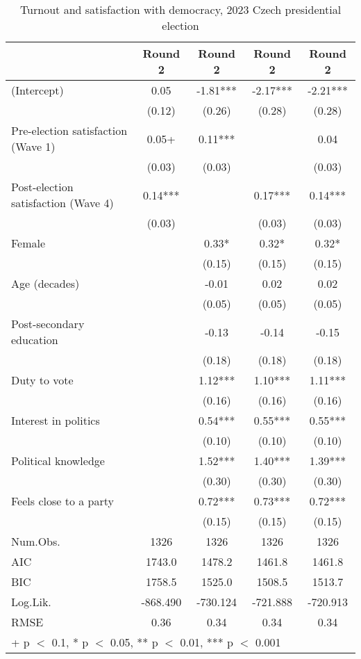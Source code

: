 \begin{table}

\caption{\label{tab:unnamed-chunk-4}Turnout and satisfaction with democracy, 2023 Czech presidential election}
\centering
\begin{tabular}[t]{lcccc}
\toprule
  & Round 2 & Round 2  & Round 2   & Round 2   \\
\midrule
(Intercept) & 0.05 & -1.81*** & -2.17*** & -2.21***\\
 & (0.12) & (0.26) & (0.28) & (0.28)\\
Pre-election satisfaction (Wave 1) & 0.05+ & 0.11*** &  & 0.04\\
 & (0.03) & (0.03) &  & (0.03)\\
Post-election satisfaction (Wave 4) & 0.14*** &  & 0.17*** & 0.14***\\
 & (0.03) &  & (0.03) & (0.03)\\
Female &  & 0.33* & 0.32* & 0.32*\\
 &  & (0.15) & (0.15) & \vphantom{1} (0.15)\\
Age (decades) &  & -0.01 & 0.02 & 0.02\\
 &  & (0.05) & (0.05) & (0.05)\\
Post-secondary education &  & -0.13 & -0.14 & -0.15\\
 &  & (0.18) & (0.18) & (0.18)\\
Duty to vote &  & 1.12*** & 1.10*** & 1.11***\\
 &  & (0.16) & (0.16) & (0.16)\\
Interest in politics &  & 0.54*** & 0.55*** & 0.55***\\
 &  & (0.10) & (0.10) & (0.10)\\
Political knowledge &  & 1.52*** & 1.40*** & 1.39***\\
 &  & (0.30) & (0.30) & (0.30)\\
Feels close to a party &  & 0.72*** & 0.73*** & 0.72***\\
 &  & (0.15) & (0.15) & (0.15)\\
\midrule
Num.Obs. & 1326 & 1326 & 1326 & 1326\\
AIC & 1743.0 & 1478.2 & 1461.8 & 1461.8\\
BIC & 1758.5 & 1525.0 & 1508.5 & 1513.7\\
Log.Lik. & -868.490 & -730.124 & -721.888 & -720.913\\
RMSE & 0.36 & 0.34 & 0.34 & 0.34\\
\bottomrule
\multicolumn{5}{l}{\rule{0pt}{1em}+ p $<$ 0.1, * p $<$ 0.05, ** p $<$ 0.01, *** p $<$ 0.001}\\
\end{tabular}
\end{table}
